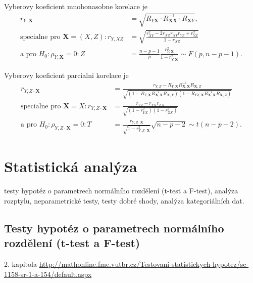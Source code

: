 \begin{definition}
Vyberovy koeficient mnohonasobne korelace je
\begin{align*}
r_{Y, \mathbf{X}} &= \sqrt{R_{Y \mathbf{X}} \cdot R_{\mathbf{X} \mathbf{X}}^{-1} \cdot R_{\mathbf{X} Y}},\\
\text{specialne pro } \mathbf{X}=(X,Z): r_{Y, XZ} &= \sqrt{\frac{r_{XY}^2 - 2 r_{XZ} r_{XY} r_{YZ} + r_{YZ}^2}{1 - r_{XZ}}} \\
\text{a pro } H_0: \rho_{Y, \mathbf{X}} = 0: Z &= \frac{n - p - 1}{p} \frac{r_{Y, \mathbf{X}}^2}{1 - r_{Y, \mathbf{X}}^2} \sim F(p, n - p - 1).
\end{align*}

Vyberovy koeficient parcialni korelace je
\begin{align*}
r_{Y,Z \cdot \mathbf{X}} &= \frac{r_{Y,Z} - R_{Y, \mathbf{X}} R_{\mathbf{X}, \mathbf{X}}^{-1} R_{\mathbf{X}, Z}}{\sqrt{(1 - R_{Y, \mathbf{X}} R_{\mathbf{X}, \mathbf{X}}^{-1} R_{\mathbf{X}, Y}) (1 - R_{YZ, \mathbf{X}} R_{\mathbf{X}, \mathbf{X}}^{-1} R_{\mathbf{X}, Z})}}\\
\text{specialne pro } \mathbf{X} = X: r_{Y, Z \cdot \mathbf{X}} &= \frac{r_{YZ} - r_{YX} r_{ZX}}{\sqrt{(1 - r_{YX}^2) (1 - r_{ZX}^2)}} \\
\text{a pro } H_0: \rho_{Y,Z \cdot \mathbf{X}} = 0: T &= \frac{r_{Y,Z \cdot \mathbf{X}}}{\sqrt{1 - r_{Y,Z \cdot \mathbf{X}}^2}} \sqrt{n - p -2} \sim t(n - p - 2).
\end{align*}
\end{definition}



\section{Statistická analýza}
testy hypotéz o parametrech normálního rozdělení (t-test a F-test), analýza rozptylu, neparametrické testy, testy dobré shody, analýza 
kategoriálních dat.

\subsection{Testy hypotéz o parametrech normálního rozdělení (t-test a F-test)}
2. kapitola 
\url{http://mathonline.fme.vutbr.cz/Testovani-statistickych-hypotez/sc-1158-sr-1-a-154/default.aspx}

